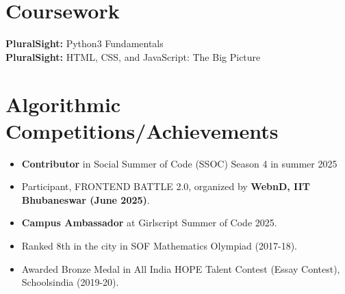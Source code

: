 \documentclass[letterpaper,11pt]{article}
\newcommand{\resumeItem}[1]{
  \item\small{
    {#1 \vspace{-2pt}}
  }
}
\newcommand{\resumeItemListStart}{\begin{itemize}}
\newcommand{\resumeItemListEnd}{\end{itemize}\vspace{-5pt}}
\begin{document}
\section{ Coursework}
\begin{itemize}[leftmargin=0.15in, label={}]
\small{\item{
       
        \textbf{PluralSight:} Python3 Fundamentals \\
        \textbf{PluralSight:} HTML, CSS, and JavaScript: The Big Picture\\
        
    }}

\end{itemize}

\section{Algorithmic Competitions/Achievements}
\resumeItemListStart
  \resumeItem{\textbf{Contributor} in Social Summer of Code (SSOC) Season 4 in summer 2025 }
  \resumeItem{Participant, FRONTEND BATTLE 2.0, organized by \textbf{WebnD, IIT Bhubaneswar (June 2025)}.}
  \resumeItem{\textbf{Campus Ambassador} at Girlscript Summer of Code 2025.}
  \resumeItem{Ranked 8th in the city in SOF Mathematics Olympiad (2017-18).}
  \resumeItem{Awarded Bronze Medal in All India HOPE Talent Contest (Essay Contest), Schoolsindia (2019-20).}
\resumeItemListEnd



\end{document}
